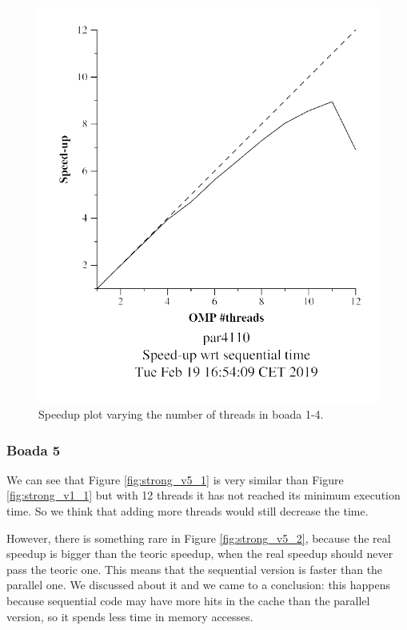 \documentclass[12pt, a4paper]{article}
\begin{document}
\begin{figure}[ht]
\begin{minipage}[b]{0.45\linewidth}
\includegraphics[width=\textwidth]{./images/strong_v1_2}

\caption{Speedup plot varying the number of threads in boada 1-4.}
\label{fig:strong_v1_2}
\end{minipage}
\end{figure}

\subsubsection{Boada 5}

We can see that Figure \ref{fig:strong_v5_1} is very similar than Figure \ref{fig:strong_v1_1} but with 12 threads it has not reached its minimum execution time. So we think that adding more threads would still decrease the time.

However, there is something rare in Figure \ref{fig:strong_v5_2}, because the real speedup is bigger than the teoric speedup, when the real speedup should never pass the teoric one. This means that the sequential version is faster than the parallel one. We discussed about it and we came to a conclusion: this happens because sequential code may have more hits in the cache than the parallel version, so it spends less time in memory accesses.
\end{document}
